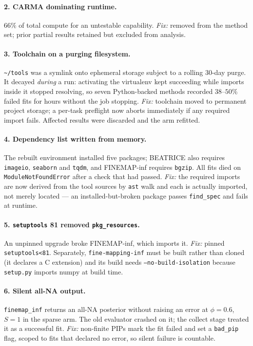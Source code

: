 \documentclass[11pt,a4paper]{article}
\newcommand{\file}[1]{\texttt{\small #1}}
\begin{document}
\paragraph{2. CARMA dominating runtime.} $66\%$ of total compute for an
untestable capability. \emph{Fix:} removed from the method set; prior partial
results retained but excluded from analysis.

\paragraph{3. Toolchain on a purging filesystem.} \file{\textasciitilde/tools}
was a symlink onto ephemeral storage subject to a rolling 30-day purge. It
decayed \emph{during} a run: activating the virtualenv kept succeeding while
imports inside it stopped resolving, so seven Python-backed methods recorded
$38$--$50\%$ failed fits for hours without the job stopping. \emph{Fix:}
toolchain moved to permanent project storage; a per-task preflight now aborts
immediately if any required import fails. Affected results were discarded and
the arm refitted.

\paragraph{4. Dependency list written from memory.} The rebuilt environment
installed five packages; BEATRICE also requires \texttt{imageio},
\texttt{seaborn} and \texttt{tqdm}, and FINEMAP-inf requires \texttt{bgzip}. All
fits died on \texttt{ModuleNotFoundError} after a check that had passed.
\emph{Fix:} the required imports are now derived from the tool sources by
\texttt{ast} walk and each is actually imported, not merely located --- an
installed-but-broken package passes \texttt{find\_spec} and fails at runtime.

\paragraph{5. \texttt{setuptools} 81 removed \texttt{pkg\_resources}.} An
unpinned upgrade broke FINEMAP-inf, which imports it. \emph{Fix:} pinned
\texttt{setuptools<81}. Separately, \file{fine-mapping-inf} must be built rather
than cloned (it declares a C extension) and its build needs
\texttt{--no-build-isolation} because \file{setup.py} imports numpy at build
time.

\paragraph{6. Silent all-NA output.} \texttt{finemap\_inf} returns an all-NA
posterior without raising an error at $\phi=0.6$, $S=1$ in the sparse arm. The
old evaluator crashed on it; the collect stage treated it as a successful fit.
\emph{Fix:} non-finite PIPs mark the fit failed and set a \texttt{bad\_pip} flag,
scoped to fits that declared no error, so silent failure is countable.
\end{document}
